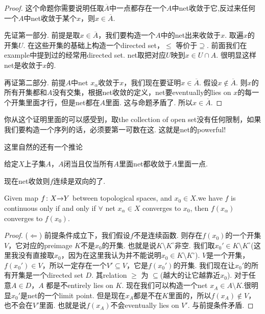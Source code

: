 \begin{proof}
这个命题你需要说明任取$\overline{A}$中一点都存在一个$A$中net收敛于它,反过来任何一个$A$中net收敛于某个$x$，则$x \in \overline{A}$.

先证第一部分. 前提是取$x \in \overline{A}$，我们要构造一个$A$中的net出来收敛于$x$. 取遍$x$的开集$U$. 在这些开集的基础上构造一个directed set，$\leq$ 等价于$\supseteq$. 前面我们在example中提到过的经常用directed set. net取把对应$U$映到$x \in U \cap A$. 很明显这样net是收敛于$x$的.

再证第二部分. 前提$A$中net $x_\alpha$收敛于$x$，我们现在要证明$x \in \overline{A}$. 假设$x \notin \overline{A}$. 则$x$的所有开集都和$A$没有交集，根据net收敛的定义，net要eventually的lies on $x$的每一个开集里面才行，但是net都在$A$里面. 这与命题矛盾了. 所以$x \in \overline{A}.$
\end{proof}

你从这个证明里面的可以感受到，取the collection of open set没有任何限制，如果我们要构造一个序列的话，必须要第一可数在这. 这就是net的powerful! 

这里自然的还有一个推论

\begin{corollary}
给定$X$上子集$A$，$A$闭当且仅当所有$A$里面net都收敛于$A$里面一点.
\end{corollary}

现在net收敛则$f$连续是双向的了.
\begin{proposition}
Given map ${f}\colon{X}{\to}{Y}$ between topological spaces, and $x_0 \in X$.we have $f$ is continuous only if and only if $\forall$ net $x_\alpha \in X$ converges to $x_0$, then $f(x_\alpha)$ converges to $f(x_0)$.
\end{proposition}

\begin{proof}
($\Leftarrow$) 前提条件成立下，我们假设$f$不是连续函数. 则存在$f(x_0)$的一个开集$V$，它对应的preimage $K$不是$x_0$的开集. 也就是说$K \setminus K^\circ$非空. 我们取$x_0' \in K \setminus K^\circ$(这里我没有直接取$x_0$，因为在这里我认为并不能说明$x_0 \in K \setminus K^\circ$). $V$是一个开集，$f(x_0') \in V$，所以一定存在一个$V' \subseteq V$，它是$f(x_0')$的开集. 我们现在让$x_0'$的所有开集是一个directed set $D$. 其relation $\geq$ 为 $\subseteq$(越大的让它越靠近$x_0$). 对于任意$A \in D$，$A$ 都是不entirely lies on $K$. 现在我们可以构造一个net $x_A \in A \setminus K$.很明显$x_0'$是net的一个limit point. 但是现在$x_A$都是不在$K$里面的，所以$f(x_A) \notin V$，也不会在$V'$里面. 也就是说$f(x_A)$不会eventually lies on $V'$. 与前提条件矛盾.
\end{proof}

